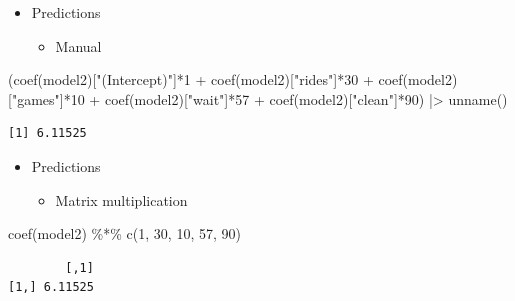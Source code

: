 \documentclass[
  ignorenonframetext,
]{beamer}
\newenvironment{Shaded}{\begin{snugshade}}{\end{snugshade}}
\newcommand{\DecValTok}[1]{\textcolor[rgb]{0.68,0.00,0.00}{#1}}
\newcommand{\FunctionTok}[1]{\textcolor[rgb]{0.28,0.35,0.67}{#1}}
\newcommand{\NormalTok}[1]{\textcolor[rgb]{0.00,0.23,0.31}{#1}}
\newcommand{\SpecialCharTok}[1]{\textcolor[rgb]{0.37,0.37,0.37}{#1}}
\newcommand{\StringTok}[1]{\textcolor[rgb]{0.13,0.47,0.30}{#1}}
\providecommand{\tightlist}{%
  \setlength{\itemsep}{0pt}\setlength{\parskip}{0pt}}\usepackage{longtable,booktabs,array}
\begin{document}
\begin{frame}[fragile]{}
\label{section-32}
\begin{itemize}
\item
  Predictions

  \begin{itemize}
  \tightlist
  \item
    Manual
  \end{itemize}
\end{itemize}

\tiny

\begin{Shaded}
\begin{Highlighting}[]
\NormalTok{(}\FunctionTok{coef}\NormalTok{(model2)[}\StringTok{"(Intercept)"}\NormalTok{]}\SpecialCharTok{*}\DecValTok{1} \SpecialCharTok{+} \FunctionTok{coef}\NormalTok{(model2)[}\StringTok{"rides"}\NormalTok{]}\SpecialCharTok{*}\DecValTok{30} \SpecialCharTok{+} \FunctionTok{coef}\NormalTok{(model2)[}\StringTok{"games"}\NormalTok{]}\SpecialCharTok{*}\DecValTok{10} \SpecialCharTok{+} 
    \FunctionTok{coef}\NormalTok{(model2)[}\StringTok{"wait"}\NormalTok{]}\SpecialCharTok{*}\DecValTok{57} \SpecialCharTok{+}  \FunctionTok{coef}\NormalTok{(model2)[}\StringTok{"clean"}\NormalTok{]}\SpecialCharTok{*}\DecValTok{90}\NormalTok{) }\SpecialCharTok{|\textgreater{}}
  \FunctionTok{unname}\NormalTok{()}
\end{Highlighting}
\end{Shaded}

\begin{verbatim}
[1] 6.11525
\end{verbatim}

\begin{itemize}
\item
  Predictions

  \begin{itemize}
  \tightlist
  \item
    Matrix multiplication
  \end{itemize}
\end{itemize}

\begin{Shaded}
\begin{Highlighting}[]
\FunctionTok{coef}\NormalTok{(model2) }\SpecialCharTok{\%*\%} \FunctionTok{c}\NormalTok{(}\DecValTok{1}\NormalTok{, }\DecValTok{30}\NormalTok{, }\DecValTok{10}\NormalTok{, }\DecValTok{57}\NormalTok{, }\DecValTok{90}\NormalTok{)}
\end{Highlighting}
\end{Shaded}

\begin{verbatim}
        [,1]
[1,] 6.11525
\end{verbatim}
\end{frame}
\end{document}
